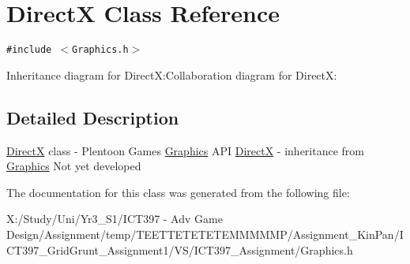 \hypertarget{class_direct_x}{
\section{DirectX Class Reference}
\label{class_direct_x}
}
{\tt \#include $<$Graphics.h$>$}

Inheritance diagram for DirectX:Collaboration diagram for DirectX:

\subsection{Detailed Description}
\hyperlink{class_direct_x}{DirectX} class - Plentoon Games \hyperlink{class_graphics}{Graphics} API \hyperlink{class_direct_x}{DirectX} - inheritance from \hyperlink{class_graphics}{Graphics} Not yet developed 

The documentation for this class was generated from the following file:\begin{CompactItemize}
\item 
X:/Study/Uni/Yr3\_\-S1/ICT397 - Adv Game Design/Assignment/temp/TEETTETETETEMMMMMP/Assignment\_\-KinPan/ICT397\_\-GridGrunt\_\-Assignment1/VS/ICT397\_\-Assignment/Graphics.h\end{CompactItemize}

